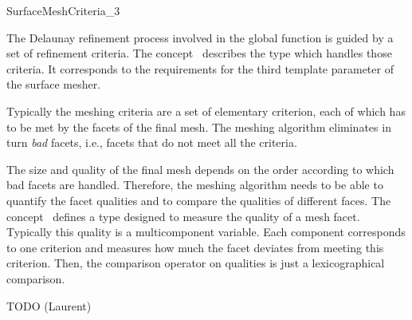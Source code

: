 

\begin{ccRefConcept}{SurfaceMeshCriteria_3}

\ccDefinition
  
The Delaunay refinement process involved in  the 
global function  
is guided by a set of refinement criteria.
The concept \ccRefName\ describes the type  which
handles those criteria. 
It corresponds to the requirements for the third template parameter
 of the surface mesher.

Typically the meshing criteria are a set
of elementary criterion, each of which
has to be met by  the facets of the final mesh.
The meshing algorithm eliminates in turn  {\em bad} facets, i.e.,
facets that do not meet all the criteria.

The size and quality of the final mesh 
depends on the order according to which bad facets
are handled. Therefore, the meshing algorithm 
needs to be able to quantify the facet qualities and to compare
the qualities of different faces.
The concept \ccRefName\ 
defines a type  designed to measure
the quality of a mesh facet. 
Typically this quality
is a multicomponent variable.  Each component corresponds to
one criterion and measures how much the facet deviates from
meeting this criterion. Then, the  comparison operator on qualities
is just a lexicographical comparison.

\ccHasModels


TODO (Laurent)

\end{ccRefConcept}


